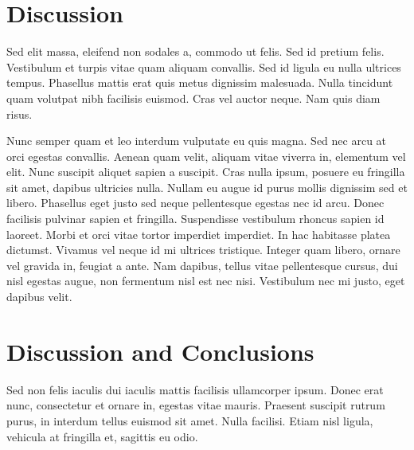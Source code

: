 \documentclass{emulateapj}
\begin{document}
\section{Discussion}
Sed elit massa, eleifend non sodales a, commodo ut felis. Sed id
pretium felis. Vestibulum et turpis vitae quam aliquam convallis. Sed
id ligula eu nulla ultrices tempus. Phasellus mattis erat quis metus
dignissim malesuada. Nulla tincidunt quam volutpat nibh facilisis
euismod. Cras vel auctor neque. Nam quis diam risus.

Nunc semper quam et leo interdum vulputate eu quis magna. Sed nec arcu
at orci egestas convallis. Aenean quam velit, aliquam vitae viverra
in, elementum vel elit. Nunc suscipit aliquet sapien a suscipit. Cras
nulla ipsum, posuere eu fringilla sit amet, dapibus ultricies
nulla. Nullam eu augue id purus mollis dignissim sed et
libero. Phasellus eget justo sed neque pellentesque egestas nec id
arcu. Donec facilisis pulvinar sapien et fringilla. Suspendisse
vestibulum rhoncus sapien id laoreet. Morbi et orci vitae tortor
imperdiet imperdiet. In hac habitasse platea dictumst. Vivamus vel
neque id mi ultrices tristique. Integer quam libero, ornare vel
gravida in, feugiat a ante. Nam dapibus, tellus vitae pellentesque
cursus, dui nisl egestas augue, non fermentum nisl est nec
nisi. Vestibulum nec mi justo, eget dapibus velit.






\section{Discussion and Conclusions}
Sed non felis iaculis dui iaculis mattis facilisis ullamcorper
ipsum. Donec erat nunc, consectetur et ornare in, egestas vitae
mauris. Praesent suscipit rutrum purus, in interdum tellus euismod sit
amet. Nulla facilisi. Etiam nisl ligula, vehicula at fringilla et,
sagittis eu odio.
\end{document}
